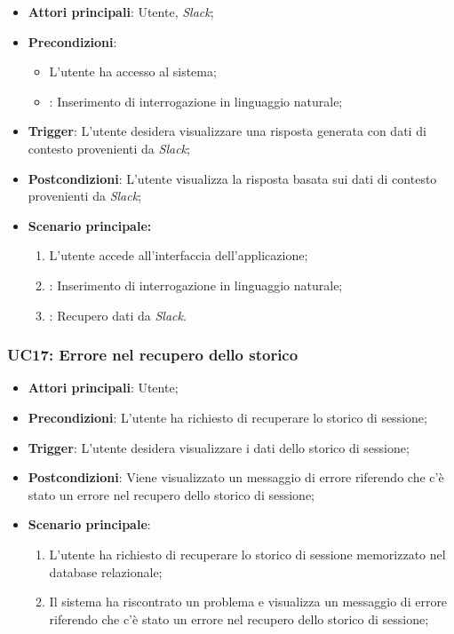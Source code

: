 \hypertarget{UC10.2}{}
\begin{itemize}
    \item \textbf{Attori principali}: Utente, \emph{Slack};
    \item \textbf{Precondizioni}: 
    \begin{itemize}
        \item L'utente ha accesso al sistema;
        \item {}: Inserimento di interrogazione in linguaggio naturale;
    \end{itemize}
    \item \textbf{Trigger}: L'utente desidera visualizzare una risposta generata con dati di contesto provenienti da \emph{Slack};
    \item \textbf{Postcondizioni}: L'utente visualizza la risposta basata sui dati di contesto provenienti da \emph{Slack};
    \item \textbf{Scenario principale:}
    \begin{enumerate}
        \item L'utente accede all'interfaccia dell'applicazione;
        \item {}: Inserimento di interrogazione in linguaggio naturale;
        \item {}: Recupero dati da \emph{Slack}.
    \end{enumerate}
\end{itemize}


\hypertarget{UC17}{}
\subsubsection{UC17: Errore nel recupero dello storico}

\begin{itemize}
    \item \textbf{Attori principali}: Utente;
    \item \textbf{Precondizioni}: L'utente ha richiesto di recuperare lo storico di sessione;
    \item \textbf{Trigger}: L'utente desidera visualizzare i dati dello storico di sessione;
    \item \textbf{Postcondizioni}: Viene visualizzato un messaggio di errore riferendo che c'è stato un errore nel recupero dello storico di sessione;
    \item \textbf{Scenario principale}: 
    \begin{enumerate}
        \item L'utente ha richiesto di recuperare lo storico di sessione memorizzato nel database relazionale;
        \item Il sistema ha riscontrato un problema e visualizza un messaggio di errore riferendo che c'è stato un errore nel recupero dello storico di sessione;
    \end{enumerate}
\end{itemize}


